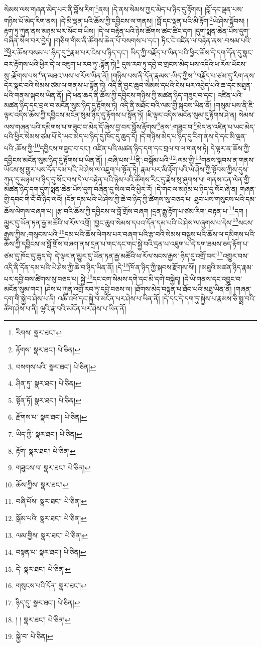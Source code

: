 སེམས་ལས་གཞན་མེད་པར་ནི་བློས་རིག་\footnote{རིགས་  སྣར་ཐང་། }ནས། །དེ་ནས་སེམས་ཀྱང་མེད་པ་ཉིད་དུ་རྟོགས། །བློ་དང་ལྡན་པས་གཉིས་པོ་མེད་རིག་ནས། །དེ་མི་ལྡན་པའི་ཆོས་ཀྱི་དབྱིངས་ལ་གནས། །བློ་དང་ལྡན་པའི་མི་རྟོག་\footnote{རྟོགས་  སྣར་ཐང་།  པེ་ཅིན། }ཡེ་ཤེས་སྟོབས། །རྟག་ཏུ་ཀུན་ནས་མཉམ་པར་སོང་བ་ཡིས། །དེ་ལ་བརྟེན་པའི་ཉེས་ཚོགས་ཚང་ཚིང་དག །དུག་སྨན་ཆེན་པོས་དུག་བཞིན་སེལ་བར་བྱེད། །གཅིག་གིས་ནི་ཚོགས་ཆེན་པོ་བསགས་པ་དང་། ཏིང་ངེ་འཛིན་ལ་བརྟེན་ནས་:བསམ་པའི་\footnote{བསགས་པའི་  སྣར་ཐང་།  པེ་ཅིན། }ཕྱིར་ཆོས་བསམ་པ་:ཉིད་དུ་\footnote{ཤིན་ཏུ་  སྣར་ཐང་།  པེ་ཅིན། }རྣམ་པར་ངེས་པ་ཉིད་དང་། ཡིད་ཀྱི་བརྗོད་པ་ཡིན་པའི་ཕྱིར་ཆོས་དེ་དག་དོན་དུ་སྣང་བར་རྟོགས་པའི་ཕྱིར་དེ་ལ་འཇུག་པ་རབ་ཏུ་:སྟོན་ཏེ།\footnote{སྟོན་ཏོ།  སྣར་ཐང་།  པེ་ཅིན། } དུས་རབ་ཏུ་དབྱེ་བ་གྲངས་མེད་པས་འདིའི་ཕ་རོལ་ཡོངས་སུ་:རྫོགས་པས་\footnote{རྫོགས་པ་  སྣར་ཐང་།  པེ་ཅིན། }ན་མཐའ་ཡས་ཕ་རོལ་ཡིན་ནོ། །གཉིས་པས་ནི་དོན་རྣམས་:ཡིད་ཀྱིས་\footnote{ཡིད་ཀྱི་  སྣར་ཐང་།  པེ་ཅིན། }བརྗོད་པ་ཙམ་དུ་རིག་ནས་དེར་སྣང་བའི་སེམས་ཙམ་ལ་གནས་པ་སྟོན་ཏེ། འདི་ནི་བྱང་ཆུབ་སེམས་དཔའི་ངེས་པར་འབྱེད་པའི་ཆ་དང་མཐུན་པའི་གནས་སྐབས་ཡིན་ནོ། །དེ་ཕན་ཆད་ནི་ཆོས་ཀྱི་དབྱིངས་གཉིས་ཀྱི་མཚན་ཉིད་གཟུང་བ་དང་། འཛིན་པའི་མཚན་ཉིད་དང་བྲལ་བ་མངོན་སུམ་ཉིད་དུ་རྟོགས་ཏེ། འདི་ནི་མཐོང་བའི་ལམ་གྱི་སྐབས་ཡིན་ནོ། །གསུམ་པས་ནི་ཇི་ལྟར་འདིས་ཆོས་ཀྱི་དབྱིངས་མངོན་སུམ་ཉིད་དུ་རྟོགས་པ་སྟོན་ཏོ། །ཇི་ལྟར་འདིས་མངོན་སུམ་དུ་རྟོགས་ཤེ་ན། སེམས་ལས་གཞན་པའི་དམིགས་པ་གཟུང་བ་མེད་དོ་ཞེས་བྱ་བར་བློས་རྟོགས་\footnote{རྟོག་  སྣར་ཐང་།  པེ་ཅིན། }ནས་:གཟུང་བ་\footnote{གཟུངས་བ་  སྣར་ཐང་།  པེ་ཅིན། }མེད་ན་འཛིན་པ་ཡང་མེད་པའི་ཕྱིར་སེམས་ཙམ་པོ་དེ་ཡང་མེད་པ་ཉིད་དུ་ཁོང་དུ་ཆུད་དོ། །དེ་གཉིས་མེད་པ་ཉིད་དུ་རིག་ནས་དེ་དང་མི་ལྡན་པའི་:ཆོས་ཀྱི་\footnote{ཆོས་ཀྱིས་  སྣར་ཐང་། }དབྱིངས་གཟུང་བ་དང་། འཛིན་པའི་མཚན་ཉིད་དག་དང་བྲལ་བ་ལ་གནས་ཏེ། དེ་ལྟར་ན་ཆོས་ཀྱི་དབྱིངས་མངོན་སུམ་ཉིད་དུ་རྟོགས་པ་ཡིན་ནོ། །:བཞི་པས་\footnote{བཞི་པོས་  སྣར་ཐང་།  པེ་ཅིན། }ནི་:བསྒོམ་པའི་\footnote{སྒོམ་པའི་  སྣར་ཐང་།  པེ་ཅིན། }:ལམ་གྱི་\footnote{ལམ་གྱིས་  སྣར་ཐང་།  པེ་ཅིན། }གནས་སྐབས་ན་གནས་ཡོངས་སུ་གྱུར་པས་དོན་དམ་པའི་ཡེ་ཤེས་ལ་འཇུག་པ་སྟོན་ཏེ། རྣམ་པར་མི་རྟོག་པའི་ཡེ་ཤེས་ཀྱི་སྟོབས་ཀྱིས་དུས་ཀུན་དུ་མཉམ་པ་ཉིད་དུ་སོང་བས་དེ་ལ་བརྟེན་པའི་ཉེས་པའི་ཚོགས་རིང་དུ་རྗེས་སུ་ཞུགས་པ། གནས་ངན་ལེན་གྱི་མཚན་ཉིད་དག་དུག་སྨན་ཆེན་པོས་དུག་བཞིན་དུ་སེལ་བའི་ཕྱིར་རོ། །དེ་གང་ལ་མཉམ་པ་ཉིད་དུ་སོང་ཞེ་ན། གཞན་གྱི་དབང་གི་ངོ་བོ་ཉིད་ལའོ། །དོན་དམ་པའི་ཡེ་ཤེས་ཀྱི་ཆེ་བ་ཉིད་ཀྱི་ཚིགས་སུ་བཅད་པ། ཐུབ་པས་གསུངས་པའི་དམ་ཆོས་ལེགས་བཞག་པ། །རྩ་བའི་ཆོས་ཀྱི་དབྱིངས་ལ་བློ་གྲོས་བཞག །དྲན་རྒྱུ་རྟོག་པ་ཙམ་རིག་:བརྟན་པ་\footnote{བསྟན་པ་  སྣར་ཐང་།  པེ་ཅིན། }དག །མྱུར་དུ་ཡོན་ཏན་རྒྱ་མཚོའི་ཕ་རོལ་འགྲོ། །བྱང་ཆུབ་སེམས་དཔའ་དོན་དམ་པའི་ཡེ་ཤེས་ལ་ཞུགས་པ་དེས་\footnote{དེ་  སྣར་ཐང་།  པེ་ཅིན། }སངས་རྒྱས་ཀྱིས་:གསུངས་པའི་\footnote{གསུངས་པའི་དོན་  སྣར་ཐང་། }དམ་པའི་ཆོས་ལེགས་པར་བཞག་པའི་རྩ་བའི་སེམས་བསྡུས་པའི་ཆོས་ལ་དམིགས་པའི་ཆོས་ཀྱི་དབྱིངས་ལ་བློ་གྲོས་བཞག་ནས་དྲན་པ་གང་དང་གང་སྐྱེ་བའི་དྲན་པ་འཇུག་པ་དེ་དག་ཐམས་ཅད་རྟོག་པ་ཙམ་དུ་ཁོང་དུ་ཆུད་དེ། དེ་ལྟར་ན་མྱུར་དུ་ཡོན་ཏན་རྒྱ་མཚོའི་ཕ་རོལ་སངས་རྒྱས་:ཉིད་དུ་འགྲོ་བར་\footnote{ཉིད་དུ་  སྣར་ཐང་།  པེ་ཅིན། }འགྱུར་བས་འདི་ནི་དོན་དམ་པའི་ཡེ་ཤེས་ཀྱི་ཆེ་བ་ཉིད་ཡིན་ནོ། །དེ་\footnote{། །  སྣར་ཐང་།  པེ་ཅིན། }ཁོ་ན་ཉིད་ཀྱི་སྐབས་རྫོགས་སོ།། །།མཐུའི་མཚན་ཉིད་རྣམ་པར་དབྱེ་བས་ཚིགས་སུ་བཅད་པ། སྐྱེ་\footnote{སྐྱེ་བ་  པེ་ཅིན། }དང་ངག་སེམས་དགེ་དང་མི་དགེ་བསྐྱེད། །དེ་ཡི་གནས་དང་འབྱུང་བ་མངོན་སུམ་གང་། །ཤེས་པ་ཀུན་འགྲོ་རབ་ཏུ་དབྱེ་བཅས་ལ། །ཐོགས་མེད་བསྟན་པ་ཐོབ་པའི་མཐུ་ཡིན་ནོ། །གཞན་དག་གི་སྐྱེ་བ་ཤེས་པ་ནི། འཆི་འཕོ་དང་སྐྱེ་བ་མངོན་པར་ཤེས་པ་ཡིན་ནོ། །དེ་དང་དེ་དག་ཏུ་སྐྱེས་པ་རྣམས་ཅི་སྨྲ་བའི་ཚིག་ཤེས་པ་ནི། ལྷའི་རྣ་བའི་མངོན་པར་ཤེས་པ་ཡིན་ནོ། 